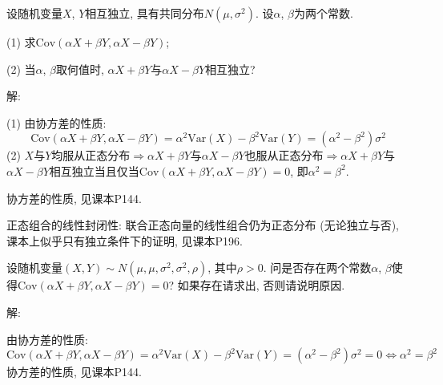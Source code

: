 \documentclass[standard]{ExBook}
\renewenvironment{shaded}{%
  \def\FrameCommand{\fboxsep=\FrameSep \colorbox{shadecolor}}%
  \MakeFramed{\advance\hsize-\width \FrameRestore}%
}{%
  \endMakeFramed
}
\begin{document}
\begin{qitems}
\vspace{2.5cm-5em}

    \begin{bbox}
    \begin{shaded}
        \qitem
设随机变量$X$, $Y$相互独立, 具有共同分布$N(\mu,\sigma^2)$. 设$\alpha$, $\beta$为两个常数.

(1) 求$\mathrm{Cov}(\alpha X+\beta Y,\alpha X-\beta Y)$;

(2) 当$\alpha$, $\beta$取何值时, $\alpha X+\beta Y$与$\alpha X-\beta Y$相互独立?
    \end{shaded}
    \end{bbox}

\vspace{\dimexpr2.5cm-5em\relax}

解: 

(1) 由协方差的性质:
$$\mathrm{Cov}(\alpha X+\beta Y,\alpha X-\beta Y)=\alpha^2 \mathrm{Var}(X)-\beta^2 \mathrm{Var}(Y)=\left(\alpha^2-\beta^2\right)\sigma^2$$
(2) $X$与$Y$均服从正态分布$\Longrightarrow$$\alpha X+\beta Y$与$\alpha X-\beta Y$也服从正态分布$\Longrightarrow$$\alpha X+\beta Y$与$\alpha X-\beta Y$相互独立当且仅当$\mathrm{Cov}(\alpha X+\beta Y,\alpha X-\beta Y)=0$, 即$\alpha^2=\beta^2$.

\textcolor{themeColor}{\selectfont {} 协方差的性质, 见课本P144.}

\textcolor{themeColor}{\selectfont {} 正态组合的线性封闭性: 联合正态向量的线性组合仍为正态分布 (无论独立与否), 课本上似乎只有独立条件下的证明, 见课本P196.}

\vspace{2.5cm-5em}

    \begin{bbox}
    \begin{shaded}
        \qitem
设随机变量$(X,Y)\sim N(\mu,\mu,\sigma^2,\sigma^2,\rho)$, 其中$\rho>0$. 问是否存在两个常数$\alpha$, $\beta$使得$\mathrm{Cov}(\alpha X+\beta Y,\alpha X-\beta Y)=0$? 如果存在请求出, 否则请说明原因.
    \end{shaded}
    \end{bbox}

\vspace{\dimexpr2.5cm-5em\relax}

解: 

由协方差的性质:
$$\mathrm{Cov}(\alpha X+\beta Y,\alpha X-\beta Y)=\alpha^2 \mathrm{Var}(X)-\beta^2 \mathrm{Var}(Y)=\left(\alpha^2-\beta^2\right)\sigma^2=0 \Longleftrightarrow \alpha^2=\beta^2$$
\textcolor{themeColor}{\selectfont {} 协方差的性质, 见课本P144.}


\end{qitems}
\end{document}
